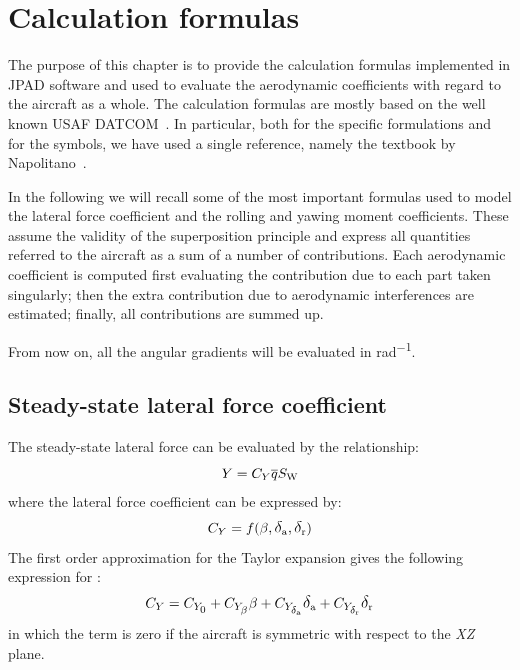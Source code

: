 \chapter{Calculation formulas}
\label{ch2}

The purpose of this chapter is to provide the calculation formulas implemented in JPAD software and used to evaluate the aerodynamic coefficients with regard to the aircraft as a whole. The calculation formulas are mostly based on the well known USAF DATCOM~\cite{book:USAF_DATCOM}. In particular, both for the specific formulations and for the symbols, we have used a single reference, namely the textbook by Napolitano~\cite{book:Napolitano}.

In the following we will recall some of the most important formulas used to model the lateral force coefficient and the rolling and yawing moment coefficients. These assume the validity of the superposition principle and express all quantities referred to the aircraft as a sum of a number of contributions. Each aerodynamic coefficient is computed first evaluating the contribution due to each part taken singularly; then the extra contribution due to aerodynamic interferences are estimated; finally, all contributions are summed up.

From now on, all the angular gradients will be evaluated in \si{rad^{-1}}.

\section{Steady-state lateral force coefficient}
\label{sec2.1}

The steady-state lateral force can be evaluated by the relationship:
\begin{equation}
\label{eq:LateralForce}
Y = C_Y \overline{q} S_{\mathrm{W}}
\end{equation}
where the lateral force coefficient can be expressed by:
\begin{equation}
\CY = f(\beta,\deltaA,\deltaR)
\end{equation}
The first order approximation for the Taylor expansion gives the following expression for \CY:
\begin{equation}
\CY = \CYzero + \CYbeta \beta + \CYdeltaa \deltaA + \CYdeltar \deltaR
\end{equation}
in which the term \CYzero is zero if the aircraft is symmetric with respect to the \emph{XZ} plane.

